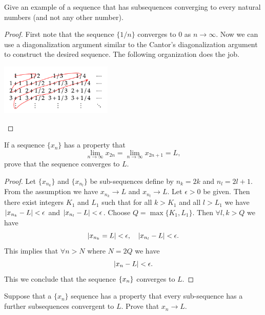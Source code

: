  \begin{problem}
 	Give an example of a sequence that has subsequences converging to every natural numbers (and not any other number).
 \end{problem}
 \begin{proof}
 	First note that the sequence $\{1/n\}$ converges to 0 as $n\to\infty$. Now we can use a diagonalization argument similar to the Cantor's diagonalization argument to construct the desired sequence. The following organization does the job.
 	\begin{center}
 		 \includegraphics[width=0.4\textwidth]{Images/diagSequence.png}
 	\end{center}

 \end{proof}
 
 \begin{problem}
 	If a sequence $\{x_n\}$ has a property that 
 	\[ \lim_{n\to\infty} x_{2n} = \lim_{n\to\infty}x_{2n+1} = L,  \]
 	prove that the sequence converges to $L$.
 \end{problem}
 \begin{proof}
 	Let $\{x_{n_k}\}$ and $\{x_{n_l}\}$ be sub-sequences define by $n_k = 2k$ and $n_l = 2l+1$. From the assumption we have $x_{n_k} \to L$ and $x_{n_l}\to L$.
 	Let $\epsilon>0$ be given. Then there exist integers $K_1$ and $L_1$ such that for all $k>K_1$ and all $l > L_1$ we have $|x_{n_k} - L| < \epsilon$ and $|x_{n_l} - L| < \epsilon$. Choose $Q = \max\{K_1, L_1\}$. Then $\forall l,k > Q$ we have
 	\[ |x_{n_k} = L| < \epsilon, \quad |x_{n_l} - L| < \epsilon. \]
 	This implies that $\forall n>N$ where $N = 2Q$ we have 
 	\[ |x_n - L| < \epsilon. \]
 	This we conclude that the sequence $\{x_n\}$ converges to $L$.
  \end{proof}
  
  \begin{problem}
  	Suppose that a $\{x_n\}$ sequence has a property that every sub-sequence has a further subsequences convergent to $L$. Prove that $x_n \to L$.
  \end{problem}

